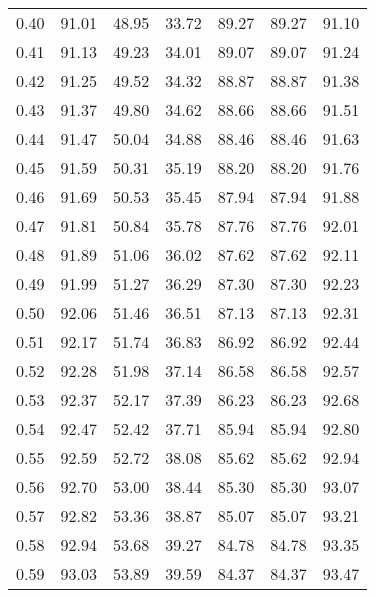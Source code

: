 \begin{tabular}{|c|c|c|c|c|c|c|}
      0.40 &     91.01 &     48.95 &      33.72 &   89.27 &      89.27 &         91.10 \\
      0.41 &     91.13 &     49.23 &      34.01 &   89.07 &      89.07 &         91.24 \\
      0.42 &     91.25 &     49.52 &      34.32 &   88.87 &      88.87 &         91.38 \\
      0.43 &     91.37 &     49.80 &      34.62 &   88.66 &      88.66 &         91.51 \\
      0.44 &     91.47 &     50.04 &      34.88 &   88.46 &      88.46 &         91.63 \\
      0.45 &     91.59 &     50.31 &      35.19 &   88.20 &      88.20 &         91.76 \\
      0.46 &     91.69 &     50.53 &      35.45 &   87.94 &      87.94 &         91.88 \\
      0.47 &     91.81 &     50.84 &      35.78 &   87.76 &      87.76 &         92.01 \\
      0.48 &     91.89 &     51.06 &      36.02 &   87.62 &      87.62 &         92.11 \\
      0.49 &     91.99 &     51.27 &      36.29 &   87.30 &      87.30 &         92.23 \\
      0.50 &     92.06 &     51.46 &      36.51 &   87.13 &      87.13 &         92.31 \\
      0.51 &     92.17 &     51.74 &      36.83 &   86.92 &      86.92 &         92.44 \\
      0.52 &     92.28 &     51.98 &      37.14 &   86.58 &      86.58 &         92.57 \\
      0.53 &     92.37 &     52.17 &      37.39 &   86.23 &      86.23 &         92.68 \\
      0.54 &     92.47 &     52.42 &      37.71 &   85.94 &      85.94 &         92.80 \\
      0.55 &     92.59 &     52.72 &      38.08 &   85.62 &      85.62 &         92.94 \\
      0.56 &     92.70 &     53.00 &      38.44 &   85.30 &      85.30 &         93.07 \\
      0.57 &     92.82 &     53.36 &      38.87 &   85.07 &      85.07 &         93.21 \\
      0.58 &     92.94 &     53.68 &      39.27 &   84.78 &      84.78 &         93.35 \\
      0.59 &     93.03 &     53.89 &      39.59 &   84.37 &      84.37 &         93.47 \\

\end{tabular}
